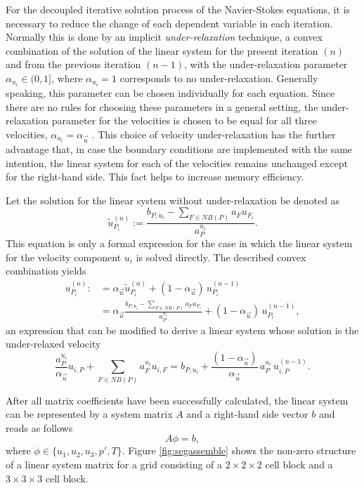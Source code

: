 For the decoupled iterative solution process of the Navier-Stokes equations, it is necessary to reduce the change of each dependent variable in each iteration. Normally this is done by an implicit \emph{under-relaxation} technique, a convex combination of the solution of the linear system for the present iteration \((n)\) and from the previous iteration \((n-1)\), with the under-relaxation parameter \(\alpha_{u_i} \in (0,1]\), where \(\alpha_{u_i} = 1\) corresponds to no under-relaxation. Generally speaking, this parameter can be chosen individually for each equation. Since there are no rules for choosing these parameters in a general setting, the under-relaxation parameter for the velocities is chosen to be equal for all three velocities, \(\alpha_{u_i} = \alpha_{\vec{u}}\) \cite{schaefer99}. This choice of velocity under-relaxation has the further advantage that, in case the boundary conditions are implemented with the same intention, the linear system for each of the velocities remains unchanged except for the right-hand side. This fact helps to increase memory efficiency.

Let the solution for the linear system without under-relaxation be denoted as
\begin{displaymath}
  \tilde{u}_{P_i}^{(n)} := \frac{b_{P,u_i} - \sum_{F \in NB(P)} a_F u_{F_i}}{a_P^{u_i}}.
\end{displaymath}
This equation is only a formal expression for the case in which the linear system for the velocity component \(u_i\) is solved directly. The described convex combination yields
\begin{align*}
  u_{P_i}^{(n)} :&= \alpha_{\vec{u}} \tilde{u}_{P_i}^{(n)} + (1 - \alpha_{\vec{u}} )\, u_{P_i}^{(n-1)} \\[0.5em]
                 &= \alpha_{\vec{u}} \frac{b_{P,u_i} - \sum_{F \in NB(P)} a_F u_{F_i}}{a_P^{u_i}} + (1 - \alpha_{\vec{u}} )\, u_{P_i}^{(n-1)},
\end{align*}
an expression that can be modified to derive a linear system whose solution is the under-relaxed velocity
\begin{displaymath}
  \frac{a_P^{u_i}}{\alpha_{\vec{u}}} u_{i,P} + \sum_{F \in NB(P)} a_F^{u_i} u_{i,F} 
  = 
  b_{P,u_i} + \frac{(1 - \alpha_{\vec{u}})}{\alpha_{\vec{u}}}\, a_P^{u_i} \, u_{i,P}^{(n-1)}. 
\end{displaymath}

After all matrix coefficients have been successfully calculated, the linear system can be represented by a system matrix \(A\) and a right-hand side vector \(b\) and reads as follows
\begin{displaymath}
  A \phi = b,
\end{displaymath}
where \(\phi \in \{u_1, u_2, u_3, p', T\}\). Figure \ref{fig:segassemble} shows the non-zero structure of a linear system matrix for a grid consisting of a \(2\times2\times2\) cell block and a \(3\times3\times3\) cell block.

